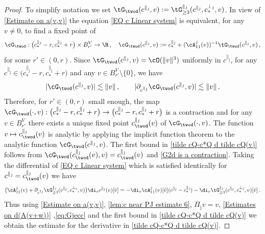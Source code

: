 \documentclass[11pt,a4paper,reqno]{article}
\numberwithin{equation}{section}
\theoremstyle{definition}
\begin{document}
\begin{proof}
To simplify notation we set
$    \tG_{\twod}(c^{\parallel_{\hat \jmath}},v):=\tG^{\parallel_{\hat \jmath}}_{\geq 3}(c^{\parallel_{\hat \jmath}},c_*^{\bot_{\hat \jmath}} ,v) $.
In view of \eqref{Estimate on a(v,v)} the equation \eqref{EQ c Linear system} is equivalent, for any $v \neq 0 $,  to find a fixed point of  
$$
\cG_{\twod}:\big(c^{\parallel_{\hat \jmath}}_*-r,c^{\parallel_{\hat \jmath}}_* +r\big)\times B_{r'}^V\to \R \, , \quad
    \cG_{\twod}(c^{\parallel_{\hat \jmath}},v):=c_*^{\parallel_{\hat \jmath}}+(\cA_{11}^{\hat \jmath}(v))^{-1}\tG_{\twod}(c^{\parallel_{\hat \jmath}},v) \, , 
$$
for some $r'\in (0,r)$.
Since $\tG_{\twod}(c^{\parallel_{\hat \jmath}},v)=\cO(\|v\|^3)$ uniformly in $c^{\parallel_{\hat \jmath}}$, for any
$c^{\parallel_{\hat \jmath}}
  \in \big(c^{\parallel_{\hat \jmath}}_*-r,c^{\parallel_{\hat \jmath}}_* +r\big)$ and  any $ v \in B_{r'}^V \setminus \{0\} $,  we have 
\begin{equation}\label{G2d is a contraction}
 |\cG_{\twod}(c^{\parallel_{\hat \jmath}},v)|\lesssim \|v\| \, , \qquad  |\partial_{c^{\parallel_{\hat \jmath}}}\cG_{\twod}(c^{\parallel_{\hat \jmath}},v)|\lesssim \|v\|\, .
\end{equation}
Therefore,  for $r'\in (0,r)$ small
enough, the map
$
    \cG_{\twod}( \cdot , v ):\big(c_*^{\parallel_{\hat \jmath}}-r,c_*^{\parallel_{\hat \jmath}}+r \big)\to \big (c_*^{\parallel_{\hat \jmath}}-r,c_*^{\parallel_{\hat \jmath}}+r \big)
$  is a contraction and 
 for any $v\in B_{r'}^V$ there exists a unique fixed point $c_{\twod}^{\parallel_{\hat \jmath}}(v)$ of $\cG_{\twod}(\cdot,v)$. 
The function $v\mapsto c^{\parallel_{\hat \jmath}}_{\twod}(v)$ is analytic by applying the implicit function theorem to the analytic function 
$ \cG_{\twod}(c^{\parallel_{\hat \jmath}},v)$. 
The first bound in \eqref{tilde cQ-c*Q d tilde cQ(v)} follows from $\cG_{\twod}(c^{\parallel_{\hat \jmath}}_{\twod}(v),v)=c^{\parallel_{\hat \jmath}}_{\twod}(v)$ and \eqref{G2d is a contraction}.
Taking the differential of  \eqref{EQ c Linear system} which is satisfied identically for $c^{\parallel_{\hat \jmath}}=c^{\parallel_{\hat \jmath}}_{\twod}(v)$ we have
\begin{equation}\label{eq:dc2d EQ}
    \big( \cA_{11}^{\hat \jmath}(v)+\partial_{c^{\parallel_{\hat \jmath}}}\tG^{\parallel_{\hat \jmath}}_{\geq 3}(c^{\parallel_{\hat \jmath}},c^{\bot_{\hat \jmath}}_*,v)\big)\di_vc^{\parallel_{\hat \jmath}}(v)[\hat v]=
    -\di_v\cA^{\hat \jmath}_{11}(v)[\hat v](c^{\parallel_{\hat \jmath}}-c_*^{\parallel_{\hat \jmath}})-\di_v\tG^{\parallel_{\hat \jmath}}_{\geq 3}(c^{\parallel_{\hat \jmath}},c^{\bot_{\hat \jmath}}_*,v)[\hat v] \, .
\end{equation}
Thus using \eqref{Estimate on a(v,v)}, \eqref{lem:c near PJ estimate 6}, $\Pi_{\hat \jmath} v=v$,  \eqref{Estimates on d(A(v+w))} ,\eqref{eq:Gjecc} and the first bound in \eqref{tilde cQ-c*Q d tilde cQ(v)} we obtain  the estimate for the derivative  in \eqref{tilde cQ-c*Q d tilde cQ(v)}.
\end{proof}
\end{document}
